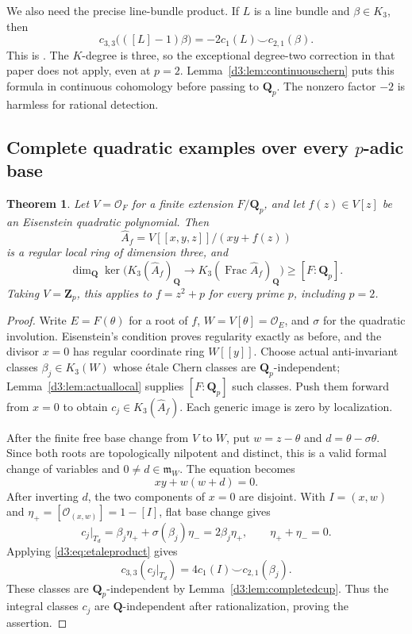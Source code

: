 \documentclass[11pt,a4paper]{amsart}
\numberwithin{equation}{section}
\newtheorem{theorem}{Theorem}[section]
\theoremstyle{definition}
\theoremstyle{remark}
\newcommand{\Q}{\mathbf Q}
\newcommand{\Z}{\mathbf Z}
\newcommand{\OO}{\mathcal O}
\newcommand{\Frac}{\operatorname{Frac}}
\begin{document}
We also need the precise line-bundle product. If $L$ is a line bundle and $\beta\in K_3$, then
\begin{equation}\label{d3:eq:etaleproduct}
c_{3,3}\bigl(([L]-1)\beta\bigr)
=-2c_1(L)\smile c_{2,1}(\beta).
\end{equation}
This is \cite[Theorem~3.11(i)]{WeibelChern}. The $K$-degree is three, so the exceptional degree-two correction in that paper does not apply, even at $p=2$. Lemma~\ref{d3:lem:continuouschern} puts this formula in continuous cohomology before passing to $\Q_p$. The nonzero factor $-2$ is harmless for rational detection.

\subsection{Complete quadratic examples over every $p$-adic base}

\begin{theorem}\label{d3:thm:completed}
Let $V=\OO_F$ for a finite extension $F/\Q_p$, and let $f(z)\in V[z]$ be an Eisenstein quadratic polynomial. Then
\[
\widehat A_f=V[[x,y,z]]/(xy+f(z))
\]
is a regular local ring of dimension three, and
\[
\dim_{\Q}\ker\bigl(K_3(\widehat A_f)_{\Q}
\longrightarrow K_3(\Frac\widehat A_f)_{\Q}\bigr)\geq[F:\Q_p].
\]
Taking $V=\Z_p$, this applies to $f=z^2+p$ for every prime $p$, including $p=2$.
\end{theorem}
\begin{proof}
Write $E=F(\theta)$ for a root of $f$, $W=V[\theta]=\OO_E$, and $\sigma$ for the quadratic involution. Eisenstein's condition proves regularity exactly as before, and the divisor $x=0$ has regular coordinate ring $W[[y]]$. Choose actual anti-invariant classes $\beta_j\in K_3(W)$ whose \'etale Chern classes are $\Q_p$-independent; Lemma~\ref{d3:lem:actuallocal} supplies $[F:\Q_p]$ such classes. Push them forward from $x=0$ to obtain $c_j\in K_3(\widehat A_f)$. Each generic image is zero by localization.

After the finite free base change from $V$ to $W$, put $w=z-\theta$ and $d=\theta-\sigma\theta$. Since both roots are topologically nilpotent and distinct, this is a valid formal change of variables and $0\ne d\in\mathfrak m_W$. The equation becomes
\[
xy+w(w+d)=0.
\]
After inverting $d$, the two components of $x=0$ are disjoint. With $I=(x,w)$ and $\eta_+=[\OO_{(x,w)}]=1-[I]$, flat base change gives
\[
c_j|_{T_d}=\beta_j\eta_++\sigma(\beta_j)\eta_-
=2\beta_j\eta_+,
\qquad \eta_++\eta_-=0.
\]
Applying \eqref{d3:eq:etaleproduct} gives
\[
c_{3,3}(c_j|_{T_d})=4c_1(I)\smile c_{2,1}(\beta_j).
\]
These classes are $\Q_p$-independent by Lemma~\ref{d3:lem:completedcup}. Thus the integral classes $c_j$ are $\Q$-independent after rationalization, proving the assertion.
\end{proof}
\end{document}
